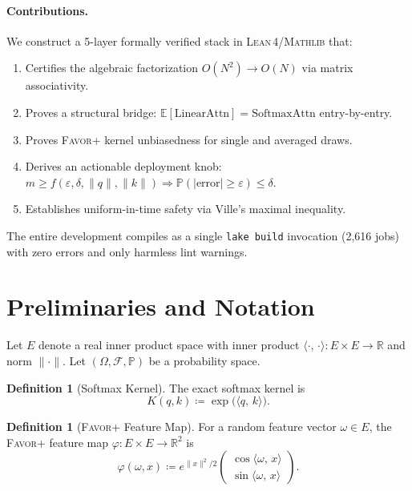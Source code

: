 \documentclass[11pt,a4paper,twocolumn]{article}
\theoremstyle{definition}
\newtheorem{definition}[theorem]{Definition}
\theoremstyle{remark}
\newcommand{\E}{\mathbb{E}}
\newcommand{\R}{\mathbb{R}}
\newcommand{\Prob}{\mathbb{P}}
\newcommand{\favor}{\textsc{Favor+}}
\newcommand{\lean}{\textsc{Lean\,4}}
\newcommand{\mathlib}{\textsc{Mathlib}}
\newcommand{\ip}[2]{\langle #1,\, #2 \rangle}
\begin{document}
\paragraph{Contributions.}
We construct a 5-layer formally verified stack in \lean{}/\mathlib{} that:

\begin{enumerate}[nosep,label=(\arabic*)]
  \item Certifies the algebraic factorization $O(N^2) \to O(N)$ via matrix
        associativity.
  \item Proves a structural bridge:
        $\E[\text{LinearAttn}] = \text{SoftmaxAttn}$ entry-by-entry.
  \item Proves \favor{} kernel unbiasedness for single and averaged draws.
  \item Derives an actionable deployment knob:
        $m \geq f(\varepsilon, \delta, \|q\|, \|k\|) \Rightarrow
        \Prob(|\text{error}| \geq \varepsilon) \leq \delta$.
  \item Establishes uniform-in-time safety via Ville's maximal inequality.
\end{enumerate}

The entire development compiles as a single \texttt{lake build} invocation
(2,616 jobs) with zero errors and only harmless lint warnings.


\section{Preliminaries and Notation}
\label{sec:prelim}

Let $E$ denote a real inner product space with inner product
$\ip{\cdot}{\cdot} : E \times E \to \R$ and norm $\|\cdot\|$.
Let $(\Omega, \mathcal{F}, \Prob)$ be a probability space.

\begin{definition}[Softmax Kernel]
\label{def:softmax}
The exact softmax kernel is
\begin{equation}
  K(q, k) \coloneqq \exp\!\bigl(\ip{q}{k}\bigr).
\end{equation}
\end{definition}

\begin{definition}[\favor{} Feature Map]
\label{def:favor}
For a random feature vector $\omega \in E$, the \favor{} feature map
$\varphi : E \times E \to \R^2$ is
\begin{equation}
  \varphi(\omega, x) \coloneqq
  e^{\|x\|^2/2}
  \begin{pmatrix}
    \cos\ip{\omega}{x} \\
    \sin\ip{\omega}{x}
  \end{pmatrix}.
\end{equation}
\end{definition}
\end{document}
